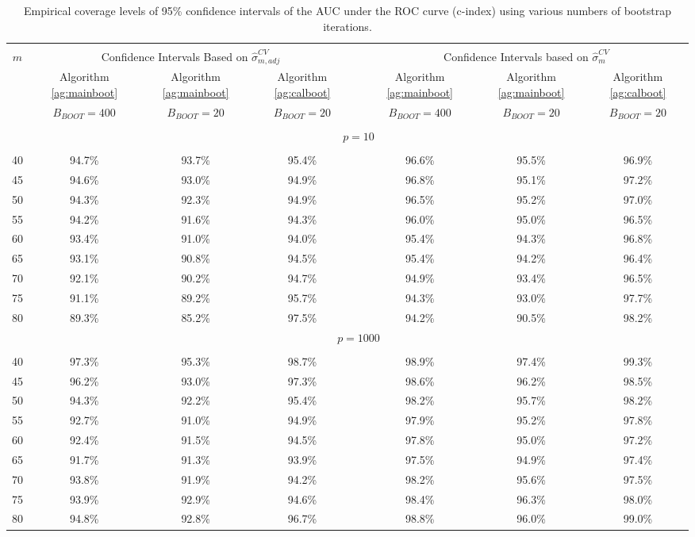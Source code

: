 \documentclass[12pt]{article}
\begin{document}
\begin{table}[ht]{
\centering
\setlength{\tabcolsep}{3pt}
\renewcommand{\arraystretch}{0.5}
\begin{tabular}{ cccccccc }
\hline\\
$m$   & \multicolumn{3}{c}{Confidence Intervals Based on $\widehat{\sigma}_{m,adj}^{CV}$} &&  \multicolumn{3}{c}{Confidence Intervals based on $\widehat{\sigma}_m^{CV}$}\\
    & Algorithm \ref{ag:mainboot} & Algorithm \ref{ag:mainboot} & Algorithm \ref{ag:calboot} && Algorithm \ref{ag:mainboot} & Algorithm \ref{ag:mainboot} & Algorithm \ref{ag:calboot}\\  
    & $B_{BOOT}=400$  & $B_{BOOT}=20$  & $B_{BOOT}=20$  && $B_{BOOT}=400$  & $B_{BOOT}=20$ & $B_{BOOT}=20$\\
        \cline{2-4} \cline{6-8}\\
    &\multicolumn{7}{c}{$p=10$}\\
    \cline{2-8}\\
40  & 94.7\% & 93.7\% & 95.4\% && 96.6\% & 95.5\% & 96.9\%\\
45  & 94.6\% & 93.0\% & 94.9\% && 96.8\% & 95.1\% & 97.2\%\\
50  & 94.3\% & 92.3\% & 94.9\% && 96.5\% & 95.2\% & 97.0\%\\
55  & 94.2\% & 91.6\% & 94.3\% && 96.0\% & 95.0\% & 96.5\%\\
60  & 93.4\% & 91.0\% & 94.0\% && 95.4\% & 94.3\% & 96.8\%\\
65  & 93.1\% & 90.8\% & 94.5\% && 95.4\% & 94.2\% & 96.4\%\\
70  & 92.1\% & 90.2\% & 94.7\% && 94.9\% & 93.4\% & 96.5\%\\
75  & 91.1\% & 89.2\% & 95.7\% && 94.3\% & 93.0\% & 97.7\%\\
80  & 89.3\% & 85.2\% & 97.5\% && 94.2\% & 90.5\% & 98.2\%\\
    & \multicolumn{7}{c}{$p = 1000$} \\
   \cline{2-8}\\
40  &  97.3\% & 95.3\% & 98.7\% && 98.9\% & 97.4\% & 99.3\%\\
45  &  96.2\% & 93.0\% & 97.3\% && 98.6\% & 96.2\% & 98.5\%\\
50  &  94.3\% & 92.2\% & 95.4\% && 98.2\% & 95.7\% & 98.2\%\\
55  &  92.7\% & 91.0\% & 94.9\% && 97.9\% & 95.2\% & 97.8\%\\
60  &  92.4\% & 91.5\% & 94.5\% && 97.8\% & 95.0\% & 97.2\%\\
65  &  91.7\% & 91.3\% & 93.9\% && 97.5\% & 94.9\% & 97.4\%\\
70  &  93.8\% & 91.9\% & 94.2\% && 98.2\% & 95.6\% & 97.5\%\\
75  &  93.9\% & 92.9\% & 94.6\% && 98.4\% & 96.3\% & 98.0\%\\
80  &  94.8\% & 92.8\% & 96.7\% && 98.8\% & 96.0\% & 99.0\%
\end{tabular}
\caption{Empirical coverage levels of 95\% confidence intervals of the AUC under the ROC curve (c-index) using various numbers of bootstrap iterations.} \label{tab:simulogisticsmall}}
\end{table} 
\end{document}
